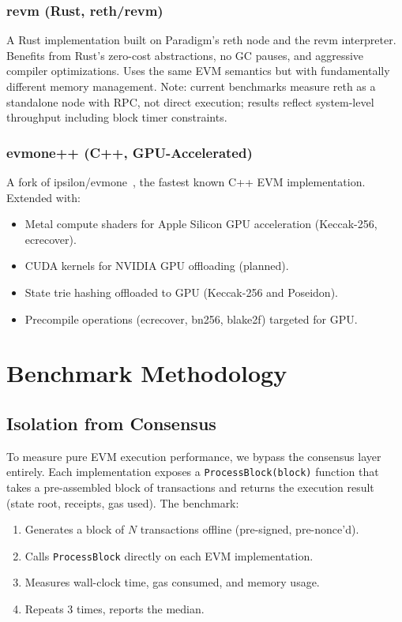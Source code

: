 \documentclass[11pt,twocolumn]{article}
\begin{document}
\subsubsection{revm (Rust, reth/revm)}
A Rust implementation built on Paradigm's reth node and the revm interpreter.
Benefits from Rust's zero-cost abstractions, no GC pauses, and aggressive
compiler optimizations. Uses the same EVM semantics but with fundamentally
different memory management. Note: current benchmarks measure reth as a
standalone node with RPC, not direct execution; results reflect system-level
throughput including block timer constraints.

\subsubsection{evmone++ (C++, GPU-Accelerated)}
A fork of ipsilon/evmone~\cite{evmone}, the fastest known C++ EVM implementation.
Extended with:
\begin{itemize}
\item Metal compute shaders for Apple Silicon GPU acceleration (Keccak-256, ecrecover).
\item CUDA kernels for NVIDIA GPU offloading (planned).
\item State trie hashing offloaded to GPU (Keccak-256 and Poseidon).
\item Precompile operations (ecrecover, bn256, blake2f) targeted for GPU.
\end{itemize}

\section{Benchmark Methodology}

\subsection{Isolation from Consensus}

To measure pure EVM execution performance, we bypass the consensus layer entirely.
Each implementation exposes a \texttt{ProcessBlock(block)} function that takes a
pre-assembled block of transactions and returns the execution result (state root,
receipts, gas used). The benchmark:

\begin{enumerate}
\item Generates a block of $N$ transactions offline (pre-signed, pre-nonce'd).
\item Calls \texttt{ProcessBlock} directly on each EVM implementation.
\item Measures wall-clock time, gas consumed, and memory usage.
\item Repeats 3 times, reports the median.
\end{enumerate}
\end{document}
